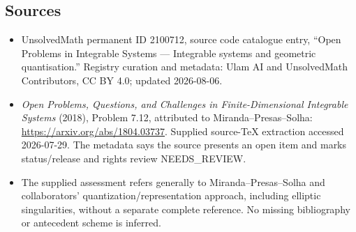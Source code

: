 \documentclass[11pt]{article}
\begin{document}
\subsection{Sources}
\begin{itemize}
\item UnsolvedMath permanent ID 2100712, source code catalogue entry, ``Open Problems in Integrable Systems --- Integrable systems and geometric quantisation.'' Registry curation and metadata: Ulam AI and UnsolvedMath Contributors, CC BY 4.0; updated 2026-08-06.
\item \emph{Open Problems, Questions, and Challenges in Finite-Dimensional Integrable Systems} (2018), Problem 7.12, attributed to Miranda--Presas--Solha: \url{https://arxiv.org/abs/1804.03737}. Supplied source-TeX extraction accessed 2026-07-29. The metadata says the source presents an open item and marks status/release and rights review NEEDS\_REVIEW.
\item The supplied assessment refers generally to Miranda--Presas--Solha and collaborators' quantization/representation approach, including elliptic singularities, without a separate complete reference. No missing bibliography or antecedent scheme is inferred.
\end{itemize}
\end{document}
